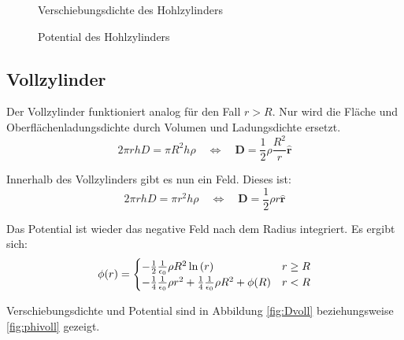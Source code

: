 \documentclass[11pt, ngerman, fleqn]{article}
\newcommand{\half}{\frac 12}
\renewcommand{\vec}[1]{\boldsymbol{#1}}
\begin{document}
\begin{figure}[h]
	\centering
	\begin{minipage}[b]{0.45\textwidth}
		\centering
		\caption{Verschiebungsdichte des Hohlzylinders}
		\label{fig:Dhohl}
	\end{minipage}
	\begin{minipage}[b]{0.45\textwidth}
		\centering
		\caption{Potential des Hohlzylinders}
		\label{fig:phihohl}
	\end{minipage}
\end{figure}

\subsection{Vollzylinder}

Der Vollzylinder funktioniert analog für den Fall $r > R$. Nur wird die Fläche und Oberflächenladungsdichte durch Volumen und Ladungsdichte ersetzt.
\[
	2 \pi r h D = \pi R^2 h \rho
	\quad \Leftrightarrow \quad
	\vec D = \half \rho \frac{R^2}{r} \hat{\vec r}
\]

Innerhalb des Vollzylinders gibt es nun ein Feld. Dieses ist:
\[
	2 \pi r h D = \pi r^2 h \rho
	\quad \Leftrightarrow \quad
	\vec D = \half \rho r \hat{\vec r}
\]

Das Potential ist wieder das negative Feld nach dem Radius integriert. Es ergibt sich:
\[
	\phi(r) = \begin{cases}
		- \half \frac{1}{\epsilon_0} \rho R^2 \ln\del{r} & r \geq R \\
   - \frac 14 \frac{1}{\epsilon_0} \rho r^2 + \frac 14 \frac{1}{\epsilon_0} \rho R^2 + \phi(R) & r < R
	\end{cases}
\]

Verschiebungsdichte und Potential sind in Abbildung \ref{fig:Dvoll} beziehungsweise \ref{fig:phivoll} gezeigt.
\end{document}
